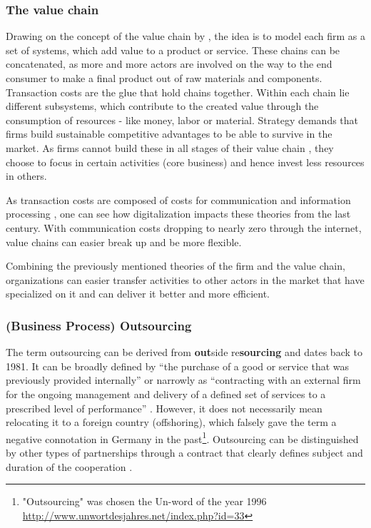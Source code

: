 		\subsubsection{The value chain}
		Drawing on the concept of the value chain by \cite{porter1985}, the idea is to model each firm as a set of systems, which add value to a product or service. These chains can be concatenated, as more and more actors are involved on the way to the end consumer to make a final product out of raw materials and components. Transaction costs are the glue that hold chains together. Within each chain lie different subsystems, which contribute to the created value through the consumption of resources - like money, labor or material. Strategy demands that firms build sustainable competitive advantages to be able to survive in the market. As firms cannot build these in all stages of their value chain \citep{Ramachandran2004}, they choose to focus in certain activities (core business) and hence invest less resources in others. 
		
		As transaction costs are composed of costs for communication and information processing \citep{evansted}, one can see how digitalization impacts these theories from the last century. With communication costs dropping to nearly zero through the internet, value chains can easier break up and be more flexible. 
		
		Combining the previously mentioned theories of the firm and the value chain, organizations can easier transfer activities to other actors in the market that have specialized on it and can deliver it better and more efficient.  
		
			\subsubsection{(Business Process) Outsourcing}
			\label{sec:bpo}
		The term outsourcing can be derived from \textbf{out}side re\textbf{sourcing} and dates back to 1981\citep{oxford}. It can be broadly defined by \enquote{the purchase of a good or service that was previously provided internally} \citep[]{lacity1993} or narrowly as \enquote{contracting with an external firm for the ongoing management and delivery of a defined set of services to a prescribed level of performance} \citep[]{cohen2006multisourcing}. However, it does not necessarily mean relocating it to a foreign country (offshoring), which falsely gave the term a negative connotation in Germany in the past\footnote{ "Outsourcing" was chosen the Un-word of the year 1996 \url{http://www.unwortdesjahres.net/index.php?id=33}}. Outsourcing can be distinguished by other types of partnerships through a contract that clearly defines subject and duration of the cooperation \citep[]{gross2006}. 
		
